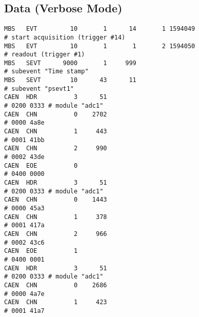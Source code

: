 \documentclass[12pt]{article}
\begin{document}
\newpage\subsection{Data (Verbose Mode)}
\begin{scriptsize}
\verb+MBS   EVT         10       1      14       1 1594049                         # start acquisition (trigger #14)+\\
\verb+MBS   EVT         10       1       1       2 1594050                         # readout (trigger #1)+\\
\verb+MBS   SEVT      9000       1     999                                         # subevent "Time stamp"+\\
\verb+MBS   SEVT        10      43      11                                         # subevent "psevt1"+\\
\verb+CAEN  HDR          3      51                                                 # 0200 0333 # module "adc1"+\\
\verb+CAEN  CHN          0    2702                                                 # 0000 4a8e+\\
\verb+CAEN  CHN          1     443                                                 # 0001 41bb+\\
\verb+CAEN  CHN          2     990                                                 # 0002 43de+\\
\verb+CAEN  EOE          0                                                         # 0400 0000+\\
\verb+CAEN  HDR          3      51                                                 # 0200 0333 # module "adc1"+\\
\verb+CAEN  CHN          0    1443                                                 # 0000 45a3+\\
\verb+CAEN  CHN          1     378                                                 # 0001 417a+\\
\verb+CAEN  CHN          2     966                                                 # 0002 43c6+\\
\verb+CAEN  EOE          1                                                         # 0400 0001+\\
\verb+CAEN  HDR          3      51                                                 # 0200 0333 # module "adc1"+\\
\verb+CAEN  CHN          0    2686                                                 # 0000 4a7e+\\
\verb+CAEN  CHN          1     423                                                 # 0001 41a7+\\

\end{scriptsize}
\end{document}
